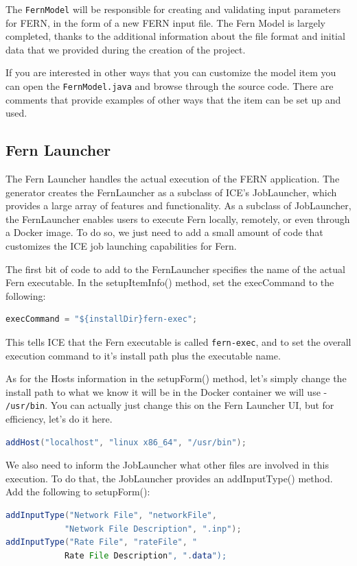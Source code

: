 The \texttt{FernModel} will be responsible for creating and
validating input parameters for FERN, in the form of a new FERN input file. 
The Fern Model is largely completed, thanks to the additional information about
the file format and initial data that we provided during the creation of the 
project.  

If you are interested in other ways that you can customize the model item you 
can open the \texttt{FernModel.java} and browse through the source code.  There
are comments that provide examples of other ways that the item can be set up 
and used.

\subsection*{Fern Launcher}
The Fern Launcher handles the actual execution of the FERN application. The
generator creates the FernLauncher as a subclass of ICE's JobLauncher, which
provides a large array of features and functionality. As a subclass of
JobLauncher, the FernLauncher enables users to execute Fern locally, remotely,
or even through a Docker image. To do so, we just need to add a small amount of
code that customizes the ICE job launching capabilities for Fern. 

The first bit of code to add to the FernLauncher specifies the name of the
actual Fern executable. In the setupItemInfo() method, set the execCommand to
the following: 
\begin{lstlisting}[language=Java]
execCommand = "${installDir}fern-exec";
\end{lstlisting}
This tells ICE that the Fern executable is called \texttt{fern-exec}, and to
set the overall execution command to it's install path plus the executable name.

As for the Hosts information in the setupForm() method, let's simply change the
install path to what we know it will be in the Docker container we will use -
\texttt{/usr/bin}.
You can actually just change this on the Fern Launcher UI, but for efficiency, let's
do it here. 
\begin{lstlisting}[language=Java]
addHost("localhost", "linux x86_64", "/usr/bin");
\end{lstlisting}
We also need to inform the JobLauncher what other files are involved in this
execution. To do that, the JobLauncher provides an addInputType() method. Add
the following to setupForm():
\begin{lstlisting}[language=Java]
addInputType("Network File", "networkFile", 
			"Network File Description", ".inp");
addInputType("Rate File", "rateFile", "
			Rate File Description", ".data");
\end{lstlisting}

